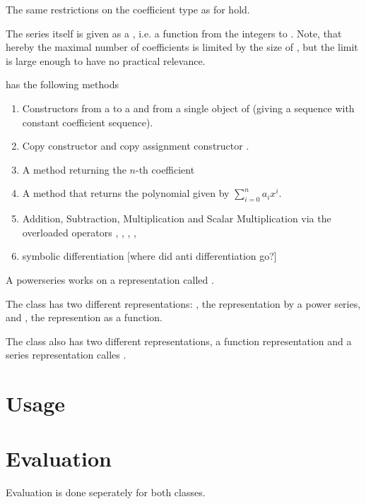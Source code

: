 			The same restrictions on the coefficient type as for \poly hold.
			
			The series itself is given as a , i.e. a function from the integers to . Note, that hereby the maximal number of coefficients is limited by the size of , 
			but the limit is large enough to have no practical relevance.   

			\powerseries has the following methods
			\begin{enumerate}
				\item Constructors from a  to a  and from a single object of  (giving a sequence with constant coefficient sequence).
				\item Copy constructor  and copy assignment constructor 
				.
				\item A method  returning the $n$-th coefficient
				\item A method  that returns the polynomial given by 
				$ \sum_{i=0}^n a_i x^i $.

				\item Addition, Subtraction, Multiplication and Scalar Multiplication via the overloaded operators \code{+}, \code{-}, \code{*}, \code{+=}, \code{*=}
				\item symbolic differentiation  [where did anti differentiation go?]
			\end{enumerate}
			A powerseries works on a representation called . 

		

		The class \textbf{\baana} has two different representations: 
		, the representation by a power series, and , the represention as a function.

		The class \textbf{\anarect} also has two different representations, 
		a function representation  and a series representation calles .
	\section{Usage}

	\section{Evaluation}
		Evaluation is done seperately for both classes.
